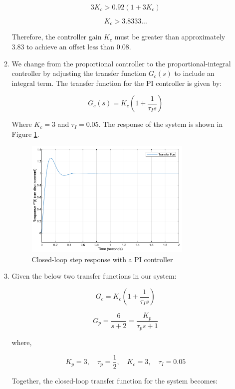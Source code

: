 \documentclass[12pt]{article}
\begin{document}
\begin{enumerate}
\begin{enumerate}
    \[
    3K_c > 0.92(1 + 3K_c)
    \]

    \[
    K_c > 3.8333...
    \]

    Therefore, the controller gain \(K_c\) must be greater than approximately 3.83 to achieve an offset less than 0.08.

    \item
    We change from the proportional controller to the proportional-integral controller by adjusting the transfer function \(G_c(s)\) to include an integral term. The transfer function for the PI controller is given by:

    \[
    G_c(s) = K_c \left(1 + \frac{1}{\tau_I s}\right)
    \]

    Where \(K_c = 3\) and \(\tau_I = 0.05\).  The response of the system is shown in Figure \ref{fig:figure1_7}.

    \begin{figure}[H]
      \centering
      \includegraphics[width=0.8\textwidth]{Figures/figure1_7.png}
      \caption{Closed-loop step response with a PI controller}
      \label{fig:figure1_7}
    \end{figure}

    \item
    Given the below two transfer functions in our system:

    \[
    G_c = K_c \left( 1 + \frac{1}{\tau_I s} \right)
    \]

    \[
    G_p = \frac{6}{s+2} = \frac{K_p}{\tau_p s + 1}
    \]

    where,

    \[
    K_p = 3, \quad \tau_p = \frac{1}{2}, \quad K_c = 3, \quad \tau_I = 0.05
    \]

    Together, the closed-loop transfer function for the system becomes:


\end{enumerate}
\end{enumerate}
\end{document}
